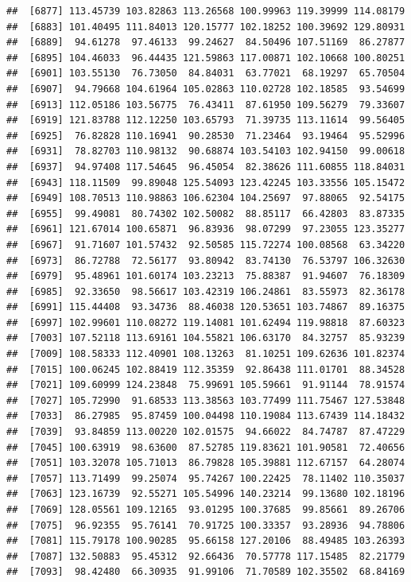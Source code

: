 \documentclass[
]{article}
\begin{document}
\begin{verbatim}
##  [6877] 113.45739 103.82863 113.26568 100.99963 119.39999 114.08179
##  [6883] 101.40495 111.84013 120.15777 102.18252 100.39692 129.80931
##  [6889]  94.61278  97.46133  99.24627  84.50496 107.51169  86.27877
##  [6895] 104.46033  96.44435 121.59863 117.00871 102.10668 100.80251
##  [6901] 103.55130  76.73050  84.84031  63.77021  68.19297  65.70504
##  [6907]  94.79668 104.61964 105.02863 110.02728 102.18585  93.54699
##  [6913] 112.05186 103.56775  76.43411  87.61950 109.56279  79.33607
##  [6919] 121.83788 112.12250 103.65793  71.39735 113.11614  99.56405
##  [6925]  76.82828 110.16941  90.28530  71.23464  93.19464  95.52996
##  [6931]  78.82703 110.98132  90.68874 103.54103 102.94150  99.00618
##  [6937]  94.97408 117.54645  96.45054  82.38626 111.60855 118.84031
##  [6943] 118.11509  99.89048 125.54093 123.42245 103.33556 105.15472
##  [6949] 108.70513 110.98863 106.62304 104.25697  97.88065  92.54175
##  [6955]  99.49081  80.74302 102.50082  88.85117  66.42803  83.87335
##  [6961] 121.67014 100.65871  96.83936  98.07299  97.23055 123.35277
##  [6967]  91.71607 101.57432  92.50585 115.72274 100.08568  63.34220
##  [6973]  86.72788  72.56177  93.80942  83.74130  76.53797 106.32630
##  [6979]  95.48961 101.60174 103.23213  75.88387  91.94607  76.18309
##  [6985]  92.33650  98.56617 103.42319 106.24861  83.55973  82.36178
##  [6991] 115.44408  93.34736  88.46038 120.53651 103.74867  89.16375
##  [6997] 102.99601 110.08272 119.14081 101.62494 119.98818  87.60323
##  [7003] 107.52118 113.69161 104.55821 106.63170  84.32757  85.93239
##  [7009] 108.58333 112.40901 108.13263  81.10251 109.62636 101.82374
##  [7015] 100.06245 102.88419 112.35359  92.86438 111.01701  88.34528
##  [7021] 109.60999 124.23848  75.99691 105.59661  91.91144  78.91574
##  [7027] 105.72990  91.68533 113.38563 103.77499 111.75467 127.53848
##  [7033]  86.27985  95.87459 100.04498 110.19084 113.67439 114.18432
##  [7039]  93.84859 113.00220 102.01575  94.66022  84.74787  87.47229
##  [7045] 100.63919  98.63600  87.52785 119.83621 101.90581  72.40656
##  [7051] 103.32078 105.71013  86.79828 105.39881 112.67157  64.28074
##  [7057] 113.71499  99.25074  95.74267 100.22425  78.11402 110.35037
##  [7063] 123.16739  92.55271 105.54996 140.23214  99.13680 102.18196
##  [7069] 128.05561 109.12165  93.01295 100.37685  99.85661  89.26706
##  [7075]  96.92355  95.76141  70.91725 100.33357  93.28936  94.78806
##  [7081] 115.79178 100.90285  95.66158 127.20106  88.49485 103.26393
##  [7087] 132.50883  95.45312  92.66436  70.57778 117.15485  82.21779
##  [7093]  98.42480  66.30935  91.99106  71.70589 102.35502  68.84169

\end{verbatim}
\end{document}
